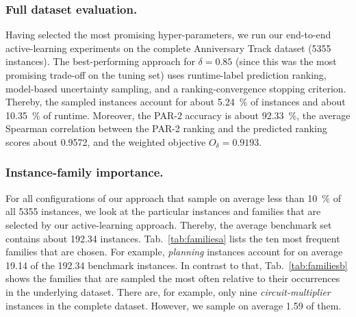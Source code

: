 \documentclass[runningheads]{llncs}
\begin{document}
\subsubsection{Full dataset evaluation.}
Having selected the most promising hyper-parameters, we run our end-to-end active-learning experiments on the complete Anniversary Track dataset (5355 instances).
The best-performing approach for $\delta = 0.85$ (since this was the most promising trade-off on the tuning set) uses runtime-label prediction ranking, model-based uncertainty sampling, and a ranking-convergence stopping criterion.
Thereby, the sampled instances account for about \SI{5.24}{\%} of instances and about \SI{10.35}{\%} of runtime.
Moreover, the PAR-2 accuracy is about \SI{92.33}{\%}, the average Spearman correlation between the PAR-2 ranking and the predicted ranking scores about \SI{0.9572}{}, and the weighted objective $O_{\delta} = 0.9193$.

\subsubsection{Instance-family importance.}
For all configurations of our approach that sample on average less than \SI{10}{\%} of all 5355 instances, we look at the particular instances and families that are selected by our active-learning approach.
Thereby, the average benchmark set contains about \SI{192.34}{} instances.
Tab.~\ref{tab:familiesa} lists the ten most frequent families that are chosen.
For example, \emph{planning} instances account for on average \SI{19.14}{} of the \SI{192.34}{} benchmark instances.
In contrast to that, Tab.~\ref{tab:familiesb} shows the families that are sampled the most often relative to their occurrences in the underlying dataset.
There are, for example, only nine \emph{circuit-multiplier} instances in the complete dataset.
However, we sample on average \SI{1.59}{} of them.
\end{document}
